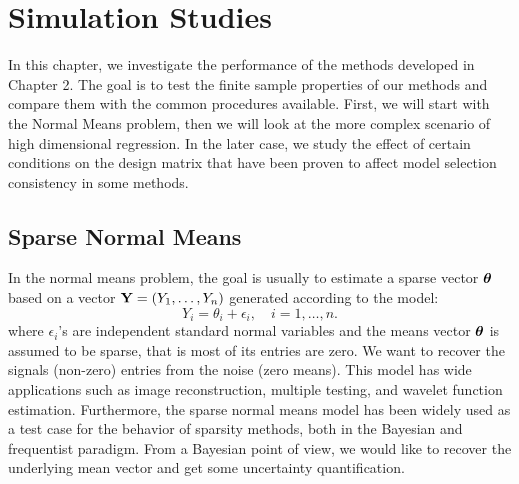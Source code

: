 \documentclass[chapters]{uamaththesis}
\begin{document}




\chapter{Simulation Studies}

In this chapter, we investigate the performance of the methods developed in Chapter 2. The goal is to test the finite sample properties of our methods and compare them with the common procedures available. First, we will start with the Normal Means problem, then we will look at the more complex scenario of high dimensional regression. In the later case, we study the effect of certain conditions on the design matrix that have been proven to affect model selection consistency in some methods.

\section{Sparse Normal Means}

In the normal means problem, the goal is usually to estimate a sparse vector $\boldsymbol{\theta}$ based on a vector ${\bf Y} = \left(Y_1, \ldots , Y_n \right) $ generated according to the model:
\begin{equation}\label{normal_means}
Y_i = \theta_i + \epsilon_i, \quad i = 1, \ldots, n.
\end{equation}
where $\epsilon_i$'s are independent standard normal variables and the means vector $\boldsymbol{\theta}$ is assumed to be sparse, that is most of its entries are zero. We want to recover the signals (non-zero) entries from the noise (zero means). This model has wide applications such as image reconstruction, multiple testing, and wavelet function estimation. 
Furthermore, the sparse normal means model has been widely used as a test case for the behavior of sparsity methods, both in the Bayesian and frequentist paradigm. From a Bayesian point of view, we would like to recover the underlying mean vector and get some uncertainty quantification. 
\end{document}
